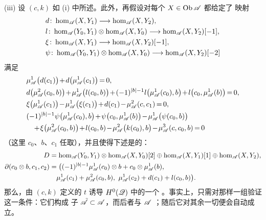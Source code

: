 \begin{lemma}
(iii) 设 $(c,k)$ 如 (i) 中所述。此外，再假设对每个 $X\in\operatorname{Ob}\mathscr{A}$ 都给定了
映射
\begin{equation*}
\begin{aligned}
&d\colon\hom_{\mathscr{A}}(X,Y_1)\longrightarrow\hom_{\mathscr{A}}(X,Y_2),\\
&l\colon\hom_{\mathscr{A}}(Y_0,Y_1)\otimes\hom_{\mathscr{A}}(X,Y_0)
\longrightarrow\hom_{\mathscr{A}}(X,Y_2)[-1],\\
&\xi\colon\hom_{\mathscr{A}}(X,Y_1)\longrightarrow\hom_{\mathscr{A}}(X,Y_2)[-1],\\
&\psi\colon\hom_{\mathscr{A}}(Y_0,Y_1)\otimes\hom_{\mathscr{A}}(X,Y_0)
\longrightarrow\hom_{\mathscr{A}}(X,Y_2)[-2]
\end{aligned}
\end{equation*}
满足
\begin{equation*}
\medmuskip=1.5mu\relax\thickmuskip=3mu\relax
\begin{aligned}
&\mu^1_{\scr{A}}\bigl(d(c_1)\bigr)+d\bigl(\mu^1_{\scr{A}}(c_1)\bigr)=0,\\
&d\bigl(\mu^2_{\scr{A}}(c_0,b)\bigr)+\mu^1_{\scr{A}}\bigl(l(c_0,b)\bigr)
+(-1)^{|b|-1}l\bigl(\mu^1_{\scr{A}}(c_0),b\bigr)
+l\bigl(c_0,\mu^1_{\scr{A}}(b)\bigr)=0,\\
&\xi\bigl(\mu^1_{\scr{A}}(c_1)\bigr)-\mu^1_{\scr{A}}\bigl(\xi(c_1)\bigr)+d(c_1)
-\mu^2_{\scr{A}}(c,c_1)=0,\\
&(-1)^{|b|-1}\psi\bigl(\mu^1_{\scr{A}}(c_0),b\bigr)
+\psi\bigl(c_0,\mu^1_{\scr{A}}(b)\bigr)
-\mu^1_{\scr{A}}\bigl(\psi(c_0,b)\bigr)\\
&\quad+\xi\bigl(\mu^2_{\scr{A}}(c_0,b)\bigr)+l(c_0,b)
-\mu^2_{\scr{A}}\bigl(k(c_0),b\bigr)-\mu^3_{\scr{A}}(c,c_0,b)=0
\end{aligned}
\end{equation*}
（这里 $c_0$、$b$、$c_1$ 任取），并且使得下述\trChainComplex{}是\trAcyclic{}的：
\begin{equation}\label{eq:acyclic-cone-complex}
\begin{aligned}
D&=\hom_{\mathscr{A}}(Y_0,Y_1)\otimes\hom_{\mathscr{A}}(X,Y_0)[2]
\oplus\hom_{\mathscr{A}}(X,Y_1)[1]\oplus\hom_{\mathscr{A}}(X,Y_2),\\
\partial(c_0\otimes b,c_1,c_2)
&=\bigl((-1)^{|b|-1}\mu^1_{\mathscr{A}}(c_0)\otimes b
+c_0\otimes\mu^1_{\mathscr{A}}(b),\\
&\quad\mu^1_{\mathscr{A}}(c_1)+\mu^2_{\mathscr{A}}(c_0,b),\
\mu^1_{\mathscr{A}}(c_2)+d(c_1)+l(c_0,b)\bigr).
\end{aligned}
\end{equation}
那么，由 $(c,k)$ 定义的\trHomomorphism{} $t$ 诱导 $H^0(\mathscr{Q})$ 中的一个%
\trIsomorphism。事实上，只需对那样一组\trObject{}验证这一条件：它们构成%
\trFull{}子\trCategory{} $\tilde{\mathscr{A}}\subset\mathscr{A}$，而后者与 $\mathscr{A}$ %
\trQuasiequivalence；随后它对其余一切\trObject{}便会自动成立。
\end{lemma}

